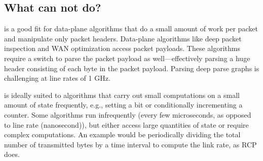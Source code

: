 \subsection{What can \absmachine not do?}
\label{ss:limitations}

\absmachine is a good fit for data-plane algorithms that do a small amount of
work per packet and manipulate only packet headers. Data-plane algorithms like
deep packet inspection and WAN optimization access packet payloads. These
algorithms require a switch to parse the packet payload as well---effectively
parsing a huge header consisting of each byte in the packet payload. Parsing
deep parse graphs is challenging at line rates of 1 GHz.

\absmachine is ideally suited to algorithms that carry out small computations
on a small amount of state frequently, e.g., setting a bit or conditionally
incrementing a counter. Some algorithms run infrequently (every few
microseconds, as opposed to line rate (nanosecond)), but either access large
quantities of state or require complex computations. An example would be
periodically dividing the total number of transmitted bytes by a time interval
to compute the link rate, as RCP does.
